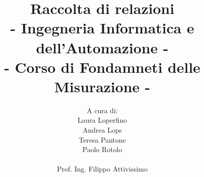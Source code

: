 \documentclass[a4paper]{article}
\title{\textbf{Raccolta di relazioni\\}
	  {\normalsize 
	  	- Ingegneria Informatica e dell'Automazione -\\
	  	- Corso di Fondamneti delle Misurazione -
  	}}
\author{A cura di:\\
	Laura Loperfino\\
	Andrea Lops \\
	Teresa Pantone\\
	Paolo Rotolo\\
	\\
	Prof. Ing. Filippo Attivissimo
}
\date{}
\begin{document}
\maketitle

\begin{abstract}

\end{abstract}

\section{}
\end{document}
